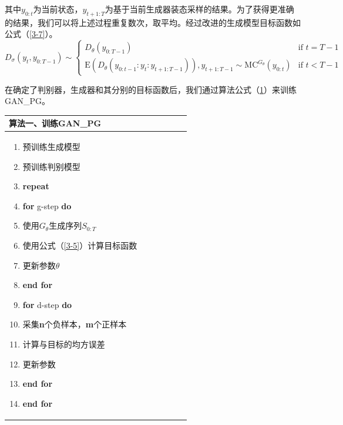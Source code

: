 \documentclass[]{template}
\begin{document}
其中$y_{0:t}$为当前状态，$y_{t+1:T}$为基于当前生成器装态采样的结果。为了获得更准确的结果，我们可以将上述过程重复数次，取平均。经过改进的生成模型目标函数如公式（\ref{3-7}）。
\begin{equation}\label{3-7}
D_\sigma(y_t,y_{0:T-1})\sim 
\begin{cases}
    D_\theta(y_{0:T-1}) & \text{if } t =T-1 \\
    \mathrm{E}(D_\theta(y_{0:t-1}:y_t:y_{t+1:T-1})),y_{t+1:T-1}\sim \mathrm{MC}^{G_\theta}(y_{0:t}) & \text{if }t<T-1
\end{cases}
\end{equation}

在确定了判别器，生成器和其分别的目标函数后，我们通过算法公式（\ref{s3-1}）来训练GAN\_PG。
\begin{table}[htbp]
    \label{s3-1}
    \begin{center}
        \begin{tabular*}{.75\linewidth}{p{0.75\linewidth}}
\toprule
            算法一、训练GAN\_PG \\
\midrule
\begin{minipage}[t]{\linewidth}
\begin{enumerate}[itemsep=-10pt]
    \item 预训练生成模型
    \item 预训练判别模型
    \item \textbf{repeat}
    \item \quad \textbf{for} g-step \textbf{do}
    \item \quad \quad 使用$G_\theta$生成序列$S_{0:T}$
    \item \quad \quad 使用公式（\ref{3-5}）计算目标函数
    \item \quad \quad 更新参数$\theta$
    \item \quad \textbf{end for}
    \item \quad \textbf{for} d-step \textbf{do}
    \item \quad \quad 采集\textbf{n}个负样本，\textbf{m}个正样本
    \item \quad \quad 计算与目标的均方误差
    \item \quad \quad 更新参数
    \item \quad \textbf{end for}  
    \item \textbf{end for}
\end{enumerate}
\end{minipage}\\
\bottomrule
        \end{tabular*}
    \end{center}
\end{table}
\end{document}
